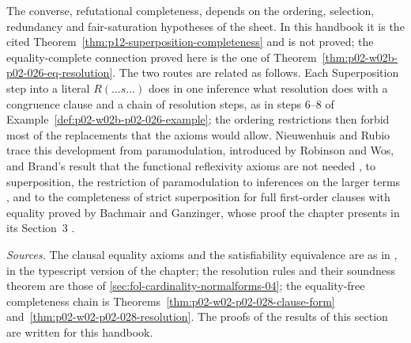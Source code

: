 The converse, refutational completeness, depends on the ordering,
selection, redundancy and fair-saturation hypotheses of the sheet.  In this
handbook it is the cited
Theorem~\ref{thm:p12-superposition-completeness} and is not proved; the
equality-complete connection proved here is the one of
Theorem~\ref{thm:p02-w02b-p02-026-eq-resolution}.  The two routes are related
as follows.  Each Superposition step into a literal \(R(\ldots s\ldots)\)
does in one inference what resolution does with a congruence clause and a
chain of resolution steps, as in steps 6--8 of
Example~\ref{def:p02-w02b-p02-026-example}; the ordering restrictions then
forbid most of the replacements that the axioms would allow.  Nieuwenhuis and
Rubio trace this development from paramodulation, introduced by Robinson and
Wos, and Brand's result that the functional reflexivity axioms are not needed
\cite[\S1.1, p.~4]{NieuwenhuisRubio2001Typescript}, to superposition, the
restriction of paramodulation to inferences on the larger terms
\cite[\S1.2, p.~5]{NieuwenhuisRubio2001Typescript}, and to the completeness
of strict superposition for full first-order clauses with equality proved by
Bachmair and Ganzinger, whose proof the chapter presents in its Section~3
\cite[\S1.2, p.~6]{NieuwenhuisRubio2001Typescript}.

\emph{Sources.}  The clausal equality axioms and the satisfiability
equivalence are as in \cite[\S1.1, pp.~3--4]{NieuwenhuisRubio2001Typescript},
in the typescript version of the chapter; the resolution rules and their soundness
theorem are those of \cref{sec:fol-cardinality-normalforms-04}; the
equality-free completeness chain is
Theorems~\ref{thm:p02-w02-p02-028-clause-form}
and~\ref{thm:p02-w02-p02-028-resolution}.  The proofs of the results of this
section are written for this handbook.
